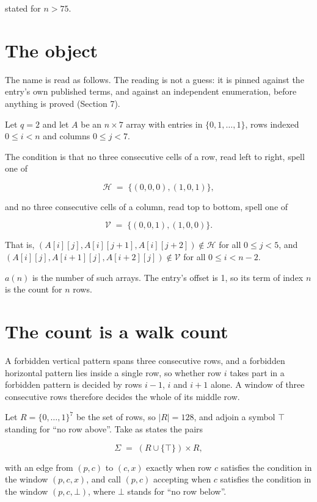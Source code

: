 \documentclass[11pt]{article}
\theoremstyle{definition}
\begin{document}
stated for $n > 75$.

\section{The object}

The name is read as follows. The reading is not a guess: it is pinned against the entry's own published terms, and against an independent enumeration, before anything is proved (Section 7).

Let $q = 2$ and let $A$ be an $n \times 7$ array with entries in $\{0,1,\dots,1\}$, rows indexed $0 \le i < n$ and columns $0 \le j < 7$.

The condition is that no three consecutive cells of a row, read left to right, spell one of

\[\mathcal{H} \;=\; \{(0,0,0), (1,0,1)\},\]

and no three consecutive cells of a column, read top to bottom, spell one of

\[\mathcal{V} \;=\; \{(0,0,1), (1,0,0)\}.\]

That is, $(A[i][j],A[i][j{+}1],A[i][j{+}2]) \notin \mathcal{H}$ for all $0 \le j < 5$, and $(A[i][j],A[i{+}1][j],A[i{+}2][j]) \notin \mathcal{V}$ for all $0 \le i < n-2$.

$a(n)$ is the number of such arrays. The entry's offset is 1, so its term of index $n$ is the count for $n$ rows.

\section{The count is a walk count}

A forbidden vertical pattern spans three consecutive rows, and a forbidden horizontal pattern lies inside a single row, so whether row $i$ takes part in a forbidden pattern is decided by rows $i-1$, $i$ and $i+1$ alone. A window of three consecutive rows therefore decides the whole of its middle row.

Let $R = \{0,\dots,1\}^{7}$ be the set of rows, so $|R| = 128$, and adjoin a symbol $\top$ standing for ``no row above''. Take as states the pairs

\[\Sigma \;=\; (R \cup \{\top\}) \times R,\]

with an edge from $(p,c)$ to $(c,x)$ exactly when row $c$ satisfies the condition in the window $(p,c,x)$, and call $(p,c)$ accepting when $c$ satisfies the condition in the window $(p,c,\bot)$, where $\bot$ stands for ``no row below''.
\end{document}
